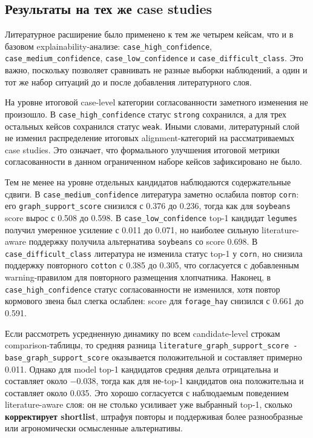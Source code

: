 \subsection{Результаты на тех же case studies}

Литературное расширение было применено к тем же четырем кейсам, что и в базовом explainability-анализе: \texttt{case\_high\_confidence}, \texttt{case\_medium\_confidence}, \texttt{case\_low\_confidence} и \texttt{case\_difficult\_class}. Это важно, поскольку позволяет сравнивать не разные выборки наблюдений, а один и тот же набор ситуаций до и после добавления литературного слоя.

На уровне итоговой case-level категории согласованности заметного изменения не произошло. В \texttt{case\_high\_confidence} статус \texttt{strong} сохранился, а для трех остальных кейсов сохранился статус \texttt{weak}. Иными словами, литературный слой не изменил распределение итоговых alignment-категорий на рассматриваемых case studies. Это означает, что формального улучшения итоговой метрики согласованности в данном ограниченном наборе кейсов зафиксировано не было.

Тем не менее на уровне отдельных кандидатов наблюдаются содержательные сдвиги. В \texttt{case\_medium\_confidence} литература заметно ослабила повтор \texttt{corn}: его \texttt{graph\_support\_score} снизился с 0.376 до 0.236, тогда как для \texttt{soybeans} score вырос с 0.508 до 0.598. В \texttt{case\_low\_confidence} top-1 кандидат \texttt{legumes} получил умеренное усиление с 0.011 до 0.071, но наиболее сильную literature-aware поддержку получила альтернатива \texttt{soybeans} со score 0.698. В \texttt{case\_difficult\_class} литература не изменила статус top-1 у \texttt{corn}, но снизила поддержку повторного \texttt{cotton} с 0.385 до 0.305, что согласуется с добавленным warning-правилом для повторного размещения хлопчатника. Наконец, в \texttt{case\_high\_confidence} статус согласованности не изменился, хотя повтор кормового звена был слегка ослаблен: score для \texttt{forage\_hay} снизился с 0.661 до 0.591.

Если рассмотреть усредненную динамику по всем candidate-level строкам comparison-таблицы, то средняя разница \texttt{literature\_graph\_support\_score - base\_graph\_support\_score} оказывается положительной и составляет примерно 0.011. Однако для model top-1 кандидатов средняя дельта отрицательна и составляет около $-0.038$, тогда как для не-top-1 кандидатов она положительна и составляет около 0.035. Это хорошо согласуется с наблюдаемым поведением literature-aware слоя: он не столько усиливает уже выбранный top-1, сколько \textbf{корректирует shortlist}, штрафуя повторы и поддерживая более разнообразные или агрономически осмысленные альтернативы.

